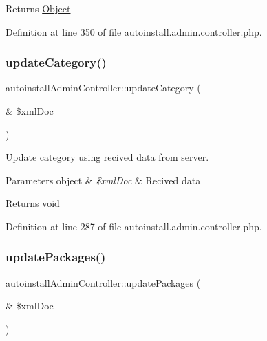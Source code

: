 \begin{DoxyReturn}{Returns}
\hyperlink{classObject}{Object} 
\end{DoxyReturn}


Definition at line 350 of file autoinstall.\+admin.\+controller.\+php.

\mbox{\label{classautoinstallAdminController_aaf27c70ad29f65b99cb9d80af6376e37}} 
\subsubsection{\texorpdfstring{update\+Category()}{updateCategory()}}
{\footnotesize\ttfamily autoinstall\+Admin\+Controller\+::update\+Category (\begin{DoxyParamCaption}\item[{\&}]{\$xml\+Doc }\end{DoxyParamCaption})}

Update category using recived data from server.


\begin{DoxyParams}[1]{Parameters}
object & {\em \$xml\+Doc} & Recived data \\
\hline
\end{DoxyParams}
\begin{DoxyReturn}{Returns}
void 
\end{DoxyReturn}


Definition at line 287 of file autoinstall.\+admin.\+controller.\+php.

\mbox{\label{classautoinstallAdminController_a1e697b55343500fc590a78c93cd8ee54}} 
\subsubsection{\texorpdfstring{update\+Packages()}{updatePackages()}}
{\footnotesize\ttfamily autoinstall\+Admin\+Controller\+::update\+Packages (\begin{DoxyParamCaption}\item[{\&}]{\$xml\+Doc }\end{DoxyParamCaption})}

